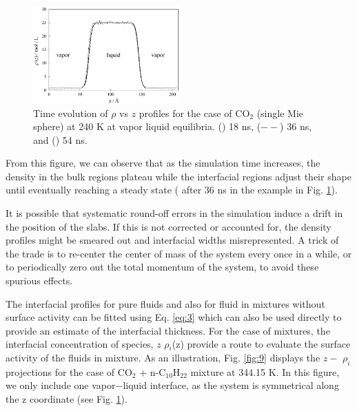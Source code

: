 \documentclass[9pt,bestpractices]{livecoms}
\begin{document}
\begin{figure}
\includegraphics[width=0.5\textwidth]{gfx/Fig_14_2.jpeg}
\caption{Time evolution of {${\rho}$} vs $z$ profiles for the case of CO$_{2}$ (single Mie sphere) at 240 K at vapor \textendash{} liquid equilibria. ({\textbullet}{\textbullet}{\textbullet}) 18 ns, (${-}{-}$) 36 ns, and (\textemdash) 54 ns.}
\label{fig:8}
\end{figure}

From this figure, we can observe that as the simulation time increases, the
density in the bulk regions plateau while the interfacial regions adjust their
shape until eventually reaching a steady state ( after 36 ns in the example in
Fig. \ref{fig:8}). 

It is possible that systematic round-off errors in the simulation induce a drift
in the position of the slabs. If this is not corrected or accounted for, the
density profiles might be smeared out and interfacial widths misrepresented.
A trick of the trade is to re-center the center of mass of the system every
once in a while, or to periodically zero out the total momentum of the system,
to avoid these spurious effects.

The interfacial profiles for pure fluids and also for fluid in mixtures without
surface activity can be fitted using Eq. \ref{eq:3} which can also be used directly to
provide an estimate of the interfacial thickness. For the case of mixtures, the
interfacial concentration of species, $z$ \textendash{}
{${\rho}$}$_{i}$(z) provide a route to evaluate the surface activity of the
fluids in mixture. As an illustration, Fig. \ref{fig:9} displays the $z{-}$
${\rho}_{i}$ projections for the case of CO$_{2}$ + n-C$_{10}$H$_{22}$
mixture at 344.15 K. In this figure, we only include one vapor${-}$liquid
interface, as the system is symmetrical along the z coordinate (see Fig. \ref{fig:8}). 
\end{document}
